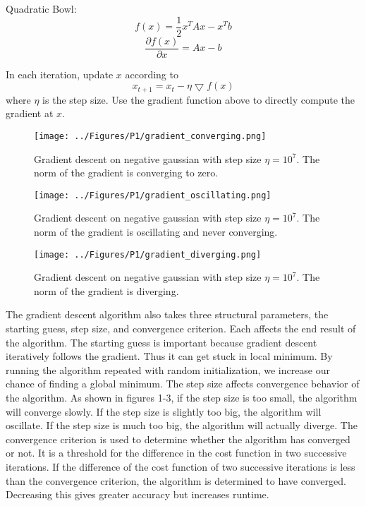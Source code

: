 \documentclass[a4paper,twoside]{article}
\begin{document}
\noindent Quadratic Bowl:
\begin{equation}
f(x) = \frac{1}{2} x^T A x - x^T b
\end{equation}
\begin{equation}
\frac{\partial f(x)}{\partial x} = Ax - b
\end{equation}

\noindent In each iteration, update $x$ according to 
\begin{equation}
x_{t+1} = x_{t} - \eta \bigtriangledown f(x)
\end{equation}
where $\eta$ is the step size. Use the gradient function above to directly compute the gradient at $x$.

\begin{figure}[h]
  \texttt{[image: ../Figures/P1/gradient\_converging.png]}
  \caption{Gradient descent on negative gaussian with step size $\eta = 10^7$. The norm of the gradient is converging to zero.}
  \label{fig:gradient_converging}
\end{figure}

\begin{figure}[h]
  \texttt{[image: ../Figures/P1/gradient\_oscillating.png]}
  \caption{Gradient descent on negative gaussian with step size $\eta = 10^7$. The norm of the gradient is oscillating and never converging.}
  \label{fig:gradient_oscillating}
\end{figure}

\begin{figure}[h]
  \texttt{[image: ../Figures/P1/gradient\_diverging.png]}
  \caption{Gradient descent on negative gaussian with step size $\eta = 10^7$. The norm of the gradient is diverging.}
  \label{fig:gradient_converging}
\end{figure}

The gradient descent algorithm also takes three structural parameters, the starting guess, step size, and convergence criterion. Each affects the end result of the algorithm. The starting guess is important because gradient descent iteratively follows the gradient. Thus it can get stuck in local minimum. By running the algorithm repeated with random initialization, we increase our chance of finding a global minimum. The step size affects convergence behavior of the algorithm. As shown in figures 1-3, if the step size is too small, the algorithm will converge slowly. If the step size is slightly too big, the algorithm will oscillate. If the step size is much too big, the algorithm will actually diverge. The convergence criterion is used to determine whether the algorithm has converged or not. It is a threshold for the difference in the cost function in two successive iterations. If the difference of the cost function of two successive iterations is less than the convergence criterion, the algorithm is determined to have converged. Decreasing this gives greater accuracy but increases runtime.
\end{document}
